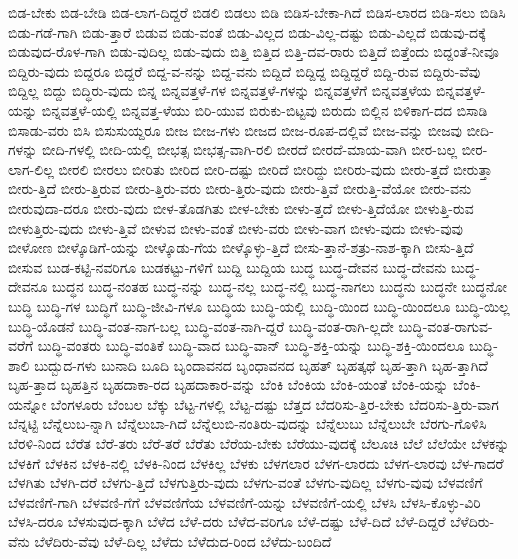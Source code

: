 {ಬಿಡ-ಬೇಕು
ಬಿಡ-ಬೇಡಿ
ಬಿಡ-ಲಾಗ-ದಿದ್ದರೆ
ಬಿಡಲಿ
ಬಿಡಲು
ಬಿಡಿ
ಬಿಡಿಸ-ಬೇಕಾ-ಗಿದೆ
ಬಿಡಿಸ-ಲಾರದ
ಬಿಡಿ-ಸಲು
ಬಿಡಿಸಿ
ಬಿಡು-ಗಡೆ-ಗಾಗಿ
ಬಿಡು-ತ್ತಾರೆ
ಬಿಡುವ
ಬಿಡು-ವಂತೆ
ಬಿಡು-ವಿಲ್ಲದ
ಬಿಡು-ವಿಲ್ಲ-ದಷ್ಟು
ಬಿಡು-ವಿಲ್ಲದೆ
ಬಿಡುವು-ದಕ್ಕೆ
ಬಿಡುವುದ-ರೊಳ-ಗಾಗಿ
ಬಿಡು-ವುದಿಲ್ಲ
ಬಿಡು-ವುದು
ಬಿತ್ತಿ
ಬಿತ್ತಿದ
ಬಿತ್ತಿ-ದವ-ರಾರು
ಬಿತ್ತಿದೆ
ಬಿತ್ತೆಂದು
ಬಿದ್ದಂತೆ-ನೀವೂ
ಬಿದ್ದಿರು-ವುದು
ಬಿದ್ದರೂ
ಬಿದ್ದರೆ
ಬಿದ್ದ-ವ-ನನ್ನು
ಬಿದ್ದ-ವನು
ಬಿದ್ದಿದೆ
ಬಿದ್ದಿದ್ದ
ಬಿದ್ದಿದ್ದರೆ
ಬಿದ್ದಿ-ರುವ
ಬಿದ್ದಿರು-ವೆವು
ಬಿದ್ದಿಲ್ಲ
ಬಿದ್ದು
ಬಿದ್ಧಿರು-ವುದು
ಬಿನ್ನ
ಬಿನ್ನವತ್ತಳೆ-ಗಳ
ಬಿನ್ನವತ್ತಳೆ-ಗಳನ್ನು
ಬಿನ್ನವತ್ತಳೆಗೆ
ಬಿನ್ನವತ್ತಳೆಯ
ಬಿನ್ನವತ್ತಳೆ-ಯನ್ನು
ಬಿನ್ನವತ್ತಳೆ-ಯಲ್ಲಿ
ಬಿನ್ನವತ್ತ-ಳೆಯು
ಬಿರಿ-ಯುವ
ಬಿರುಕು-ಬಿಟ್ಟವು
ಬಿರುದು
ಬಿಲ್ಲಿನ
ಬಿಳಿಕಾಗ-ದದ
ಬಿಸಾಡಿ
ಬಿಸಾಡು-ವರು
ಬಿಸಿ
ಬಿಸುಸುಯ್ದರೂ
ಬೀಜ
ಬೀಜ-ಗಳು
ಬೀಜದ
ಬೀಜ-ರೂಪ-ದಲ್ಲಿವೆ
ಬೀಜ-ವನ್ನು
ಬೀಜವು
ಬೀದಿ-ಗಳನ್ನು
ಬೀದಿ-ಗಳಲ್ಲಿ
ಬೀದಿ-ಯಲ್ಲಿ
ಬೀಭತ್ಸ
ಬೀಭತ್ಸ-ವಾಗಿ-ರಲಿ
ಬೀರದೆ
ಬೀರದೆ-ಮಾಯ-ವಾಗಿ
ಬೀರ-ಬಲ್ಲ
ಬೀರ-ಲಾಗ-ಲಿಲ್ಲ
ಬೀರಲಿ
ಬೀರಲು
ಬೀರಿತು
ಬೀರಿದ
ಬೀರಿ-ದಷ್ಟು
ಬೀರಿದೆ
ಬೀರಿದ್ದು
ಬೀರಿರು-ವುದು
ಬೀರು-ತ್ತದೆ
ಬೀರುತ್ತಾ
ಬೀರು-ತ್ತಿದೆ
ಬೀರು-ತ್ತಿರುವ
ಬೀರು-ತ್ತಿರು-ವರು
ಬೀರು-ತ್ತಿರು-ವುದು
ಬೀರು-ತ್ತಿವೆ
ಬೀರುತ್ತಿ-ವೆಯೋ
ಬೀರು-ವನು
ಬೀರುವುದಾ-ದರೂ
ಬೀರು-ವುದು
ಬೀಳ-ತೊಡಗಿತು
ಬೀಳ-ಬೇಕು
ಬೀಳು-ತ್ತದೆ
ಬೀಳು-ತ್ತಿದೆಯೋ
ಬೀಳುತ್ತಿ-ರುವ
ಬೀಳುತ್ತಿರು-ವುದು
ಬೀಳು-ತ್ತಿವೆ
ಬೀಳುವ
ಬೀಳು-ವಂತೆ
ಬೀಳು-ವರು
ಬೀಳು-ವಾಗ
ಬೀಳು-ವುದು
ಬೀಳು-ವುವು
ಬೀಳೋಣ
ಬೀಳ್ಕೊಡಿಗೆ-ಯನ್ನು
ಬೀಳ್ಕೊಡು-ಗೆಯ
ಬೀಳ್ಕೊಳ್ಳು-ತ್ತಿದೆ
ಬೀಸು-ತ್ತಾನೆ-ಶತ್ರು-ನಾಶ-ಕ್ಕಾಗಿ
ಬೀಸು-ತ್ತಿದೆ
ಬೀಸುವ
ಬುಡ-ಕಟ್ಟಿ-ನವರಿಗೂ
ಬುಡಕಟ್ಟು-ಗಳಿಗೆ
ಬುದ್ದಿ
ಬುದ್ದಿಯ
ಬುದ್ಧ
ಬುದ್ಧ-ದೇವನ
ಬುದ್ಧ-ದೇವನು
ಬುದ್ಧ-ದೇವನೂ
ಬುದ್ಧನ
ಬುದ್ಧ-ನಂತಹ
ಬುದ್ಧ-ನನ್ನು
ಬುದ್ಧ-ನಲ್ಲ
ಬುದ್ಧ-ನಲ್ಲಿ
ಬುದ್ಧ-ನಾಗಲು
ಬುದ್ಧನು
ಬುದ್ಧನೇ
ಬುದ್ಧನೋ
ಬುದ್ಧಿ
ಬುದ್ಧಿ-ಗಳ
ಬುದ್ಧಿಗೆ
ಬುದ್ಧಿ-ಜೀವಿ-ಗಳೂ
ಬುದ್ಧಿಯ
ಬುದ್ಧಿ-ಯಲ್ಲಿ
ಬುದ್ಧಿ-ಯಿಂದ
ಬುದ್ಧಿ-ಯಿಂದಲೂ
ಬುದ್ಧಿ-ಯಿಲ್ಲ
ಬುದ್ಧಿ-ಯೊಡನೆ
ಬುದ್ಧಿ-ವಂತ-ನಾಗ-ಬಲ್ಲ
ಬುದ್ಧಿ-ವಂತ-ನಾಗಿ-ದ್ದರೆ
ಬುದ್ಧಿ-ವಂತ-ರಾಗಿ-ಲ್ಲದೇ
ಬುದ್ಧಿ-ವಂತ-ರಾಗುವ-ವರೆಗೆ
ಬುದ್ಧಿ-ವಂತರು
ಬುದ್ಧಿ-ವಂತಿಕೆ
ಬುದ್ಧಿ-ವಾದ
ಬುದ್ಧಿ-ವಾನ್
ಬುದ್ಧಿ-ಶಕ್ತಿ-ಯನ್ನು
ಬುದ್ಧಿ-ಶಕ್ತಿ-ಯಿಂದಲೂ
ಬುದ್ಧಿ-ಶಾಲಿ
ಬುದ್ಬುದ-ಗಳು
ಬುನಾದಿ
ಬೂದಿ
ಬೃಂದಾವನದ
ಬೃಂಧಾವನದ
ಬೃಹತ್
ಬೃಹತ್ಕಥೆ
ಬೃಹ-ತ್ತಾಗಿ
ಬೃಹ-ತ್ತಾಗಿದೆ
ಬೃಹ-ತ್ತಾದ
ಬೃಹತ್ತಿನ
ಬೃಹದಾಕಾ-ರದ
ಬೃಹದಾಕಾರ-ವನ್ನು
ಬೆಂಕಿ
ಬೆಂಕಿಯ
ಬೆಂಕಿ-ಯಂತೆ
ಬೆಂಕಿ-ಯನ್ನು
ಬೆಂಕಿ-ಯನ್ನೋ
ಬೆಂಗಳೂರು
ಬೆಂಬಲ
ಬೆಕ್ಕು
ಬೆಟ್ಟ-ಗಳಲ್ಲಿ
ಬೆಟ್ಟ-ದಷ್ಟು
ಬೆತ್ತದ
ಬೆದರಿಸು-ತ್ತಿರ-ಬೇಕು
ಬೆದರಿಸು-ತ್ತಿರು-ವಾಗ
ಬೆನ್ನಟ್ಟಿ
ಬೆನ್ನೆಲುಬ-ನ್ನಾಗಿ
ಬೆನ್ನೆಲುಬಾ-ಗಿದೆ
ಬೆನ್ನೆಲುಬಿ-ನಂತಿರು-ವುದನ್ನು
ಬೆನ್ನೆಲುಬು
ಬೆನ್ನೆಲುಬೇ
ಬೆರಗು-ಗೊಳಿಸಿ
ಬೆರಳಿ-ನಿಂದ
ಬೆರೆತ
ಬೆರೆ-ತರು
ಬೆರೆ-ತರೆ
ಬೆರೆತು
ಬೆರೆಯ-ಬೇಕು
ಬೆರೆಯು-ವುದಕ್ಕೆ
ಬೆಲೂಚಿ
ಬೆಲೆ
ಬೆಲೆಯೇ
ಬೆಳಕನ್ನು
ಬೆಳಕಿಗೆ
ಬೆಳಕಿನ
ಬೆಳಕಿ-ನಲ್ಲಿ
ಬೆಳಕಿ-ನಿಂದ
ಬೆಳಕಿಲ್ಲ
ಬೆಳಕು
ಬೆಳಗಲಾರ
ಬೆಳಗ-ಲಾರದು
ಬೆಳಗ-ಲಾರವು
ಬೆಳ-ಗಾದರೆ
ಬೆಳಗಿತು
ಬೆಳಗಿ-ದರೆ
ಬೆಳಗು-ತ್ತಿದೆ
ಬೆಳಗುತ್ತಿರು-ವುದು
ಬೆಳಗು-ವಂತೆ
ಬೆಳಗು-ವುದಿಲ್ಲ
ಬೆಳಗು-ವುವು
ಬೆಳವಣಿಗೆ
ಬೆಳವಣಿಗೆ-ಗಾಗಿ
ಬೆಳವಣಿ-ಗೆಗೆ
ಬೆಳವಣಿಗೆಯ
ಬೆಳವಣಿಗೆ-ಯನ್ನು
ಬೆಳವಣಿಗೆ-ಯಲ್ಲಿ
ಬೆಳಸಿ
ಬೆಳಸಿ-ಕೊಳ್ಳು-ವಿರಿ
ಬೆಳಸಿ-ದರೂ
ಬೆಳಸುವುದ-ಕ್ಕಾಗಿ
ಬೆಳೆದ
ಬೆಳೆ-ದರು
ಬೆಳೆದ-ವರಿಗೂ
ಬೆಳೆ-ದಷ್ಟು
ಬೆಳೆ-ದಿದೆ
ಬೆಳೆ-ದಿದ್ದರೆ
ಬೆಳೆದಿರು-ವೆನು
ಬೆಳೆದಿರು-ವೆವು
ಬೆಳೆ-ದಿಲ್ಲ
ಬೆಳೆದು
ಬೆಳೆದುದ-ರಿಂದ
ಬೆಳೆದು-ಬಂದಿದೆ
}
